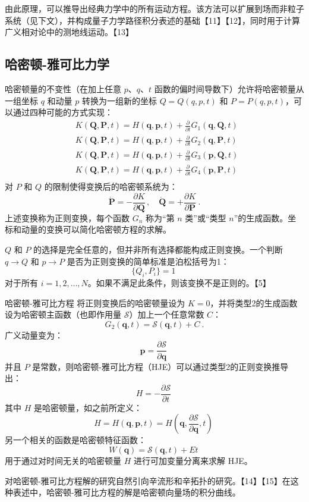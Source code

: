 由此原理，可以推导出经典力学中的所有运动方程。该方法可以扩展到场而非粒子系统（见下文），并构成量子力学路径积分表述的基础【11】【12】，同时用于计算广义相对论中的测地线运动。【13】
\subsection{哈密顿-雅可比力学}  
哈密顿量的不变性（在加上任意 \( p \)、\( q \)、\( t \) 函数的偏时间导数下）允许将哈密顿量从一组坐标 \( q \) 和动量 \( p \) 转换为一组新的坐标 \( Q = Q(q, p, t) \) 和 \( P = P(q, p, t) \)，可以通过四种可能的方式实现：
\[
\begin{aligned}
&K(\mathbf{Q}, \mathbf{P}, t) = H(\mathbf{q}, \mathbf{p}, t) + \frac{\partial}{\partial t} G_1(\mathbf{q}, \mathbf{Q}, t) \\
&K(\mathbf{Q}, \mathbf{P}, t) = H(\mathbf{q}, \mathbf{p}, t) + \frac{\partial}{\partial t} G_2(\mathbf{q}, \mathbf{P}, t) \\
&K(\mathbf{Q}, \mathbf{P}, t) = H(\mathbf{q}, \mathbf{p}, t) + \frac{\partial}{\partial t} G_3(\mathbf{p}, \mathbf{Q}, t) \\
&K(\mathbf{Q}, \mathbf{P}, t) = H(\mathbf{q}, \mathbf{p}, t) + \frac{\partial}{\partial t} G_4(\mathbf{p}, \mathbf{P}, t) \\
\end{aligned}~
\]
对 \( P \) 和 \( Q \) 的限制使得变换后的哈密顿系统为：
\[
\mathbf{\dot{P}} = -\frac{\partial K}{\partial \mathbf{Q}} \,, \quad \mathbf{\dot{Q}} = +\frac{\partial K}{\partial \mathbf{P}} ~.
\]
上述变换称为正则变换，每个函数 \( G_n \) 称为“第 \( n \) 类”或“类型 \( n \)”的生成函数。坐标和动量的变换可以简化哈密顿方程的求解。

\( Q \) 和 \( P \) 的选择是完全任意的，但并非所有选择都能构成正则变换。一个判断 \( q \to Q \) 和 \( p \to P \) 是否为正则变换的简单标准是泊松括号为1：
\[
\{ Q_i, P_i \} = 1~
\]
对于所有 \( i = 1, 2, \dots, N \)。如果不满足此条件，则该变换不是正则的。【5】

哈密顿-雅可比方程  
将正则变换后的哈密顿量设为 \( K = 0 \)，并将类型2的生成函数设为哈密顿主函数（也即作用量 \( \mathcal{S} \)）加上一个任意常数 \( C \)：
\[
G_2(\mathbf{q}, t) = \mathcal{S}(\mathbf{q}, t) + C ~.
\]
广义动量变为：
\[
\mathbf{p} = \frac{\partial \mathcal{S}}{\partial \mathbf{q}}~
\]
并且 \( P \) 是常数，则哈密顿-雅可比方程（HJE）可以通过类型2的正则变换推导出：
\[
H = -\frac{\partial \mathcal{S}}{\partial t}~
\]
其中 \( H \) 是哈密顿量，如之前所定义：
\[
H = H(\mathbf{q}, \mathbf{p}, t) = H\left(\mathbf{q}, \frac{\partial \mathcal{S}}{\partial \mathbf{q}}, t\right)~
\]
另一个相关的函数是哈密顿特征函数：
\[
W(\mathbf{q}) = \mathcal{S}(\mathbf{q}, t) + Et~
\]
用于通过对时间无关的哈密顿量 \( H \) 进行可加变量分离来求解 HJE。

对哈密顿-雅可比方程解的研究自然引向辛流形和辛拓扑的研究。【14】【15】在这种表述中，哈密顿-雅可比方程的解是哈密顿向量场的积分曲线。
